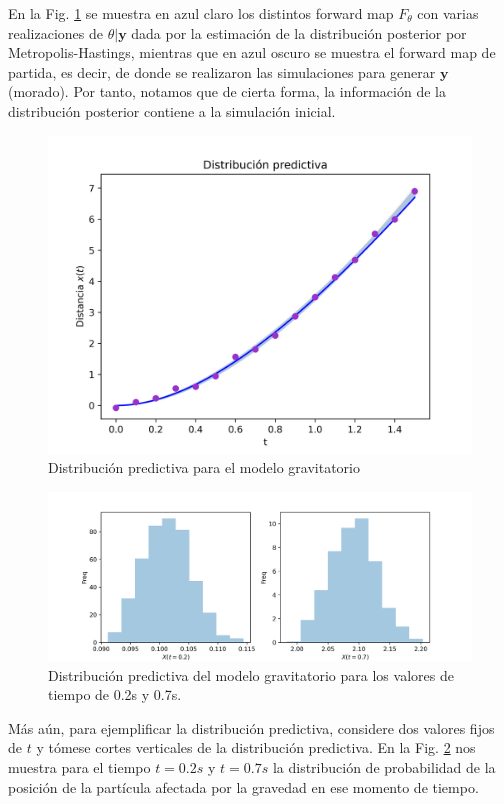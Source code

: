 En la Fig. \ref{Fig. 3.2.2.06} se muestra en azul claro los distintos forward map $F_{\theta}$ con varias realizaciones de $\theta|\mathbf{y}$ dada por la estimación de la distribución posterior por Metropolis-Hastings, mientras que en azul oscuro se muestra el forward map de partida, es decir, de donde se realizaron las simulaciones para generar $\mathbf{y}$ (morado). Por tanto, notamos que de cierta forma, la información de la distribución posterior contiene a la simulación inicial.

\begin{figure}
    \centering 
    \includegraphics[width = 10 cm ]{img/Exp_Central_gravedad_sigma/Figuras/Generales/Predictiva_gravedad_sigma.png} 
    \caption{Distribución predictiva para el modelo gravitatorio}
    \label{Fig. 3.2.2.06}
\end{figure} 

\begin{figure}[H]
    \centering 
    \includegraphics[width = 15 cm]{img/Exp_Central_gravedad_sigma/Figuras/Generales/TiempoFijo_gravedad_sigma.png} 
    \caption{Distribución predictiva del modelo gravitatorio para los valores de tiempo de 0.2s y 0.7s.}
    \label{Fig. 3.2.2.07}
\end{figure} 

Más aún, para ejemplificar la distribución predictiva, considere dos valores fijos de $t$ y tómese cortes verticales de la distribución predictiva. En la Fig. \ref{Fig. 3.2.2.07} nos muestra para el tiempo $t = 0.2 s$ y $t = 0.7s$ la distribución de probabilidad de la posición de la partícula afectada por la gravedad en ese momento de tiempo. 

